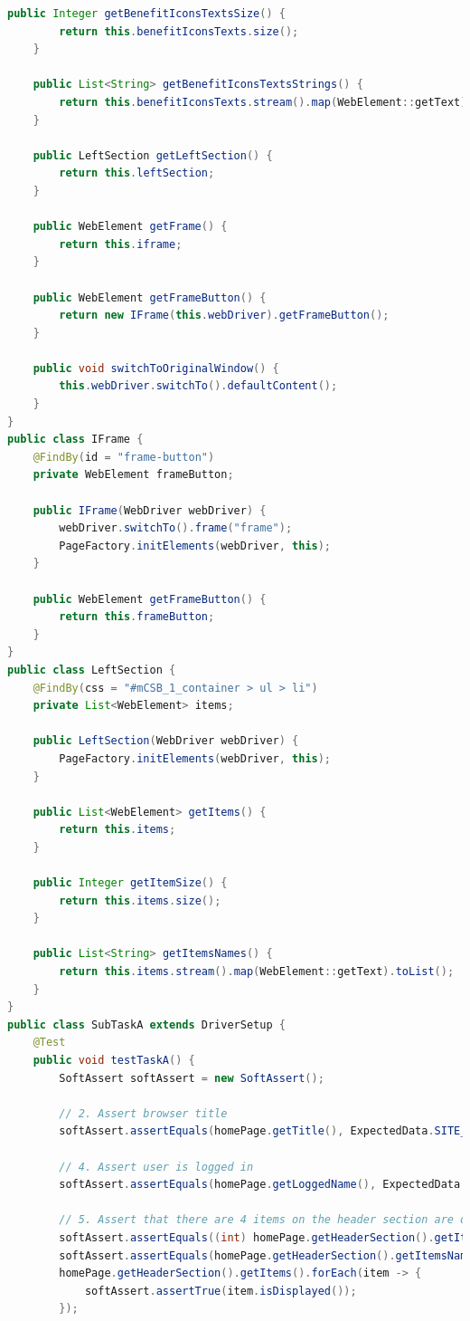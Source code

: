 \documentclass[a4paper]{article}
\begin{document}
\begin{lstlisting}[language=Java]
    public Integer getBenefitIconsTextsSize() {
        return this.benefitIconsTexts.size();
    }

    public List<String> getBenefitIconsTextsStrings() {
        return this.benefitIconsTexts.stream().map(WebElement::getText).toList();
    }

    public LeftSection getLeftSection() {
        return this.leftSection;
    }

    public WebElement getFrame() {
        return this.iframe;
    }

    public WebElement getFrameButton() {
        return new IFrame(this.webDriver).getFrameButton();
    }

    public void switchToOriginalWindow() {
        this.webDriver.switchTo().defaultContent();
    }
}
public class IFrame {
    @FindBy(id = "frame-button")
    private WebElement frameButton;

    public IFrame(WebDriver webDriver) {
        webDriver.switchTo().frame("frame");
        PageFactory.initElements(webDriver, this);
    }

    public WebElement getFrameButton() {
        return this.frameButton;
    }
}
public class LeftSection {
    @FindBy(css = "#mCSB_1_container > ul > li")
    private List<WebElement> items;

    public LeftSection(WebDriver webDriver) {
        PageFactory.initElements(webDriver, this);
    }

    public List<WebElement> getItems() {
        return this.items;
    }

    public Integer getItemSize() {
        return this.items.size();
    }

    public List<String> getItemsNames() {
        return this.items.stream().map(WebElement::getText).toList();
    }
}
public class SubTaskA extends DriverSetup {
    @Test
    public void testTaskA() {
        SoftAssert softAssert = new SoftAssert();

        // 2. Assert browser title
        softAssert.assertEquals(homePage.getTitle(), ExpectedData.SITE_NAME);

        // 4. Assert user is logged in
        softAssert.assertEquals(homePage.getLoggedName(), ExpectedData.LOGGED_USER_NAME);

        // 5. Assert that there are 4 items on the header section are displayed , and they have proper texts
        softAssert.assertEquals((int) homePage.getHeaderSection().getItemsSize(), (int) ExpectedData.HEADER_SECTION_ITEMS.size());
        softAssert.assertEquals(homePage.getHeaderSection().getItemsNames(), ExpectedData.HEADER_SECTION_ITEMS);
        homePage.getHeaderSection().getItems().forEach(item -> {
            softAssert.assertTrue(item.isDisplayed());
        });


\end{lstlisting}
\end{document}
